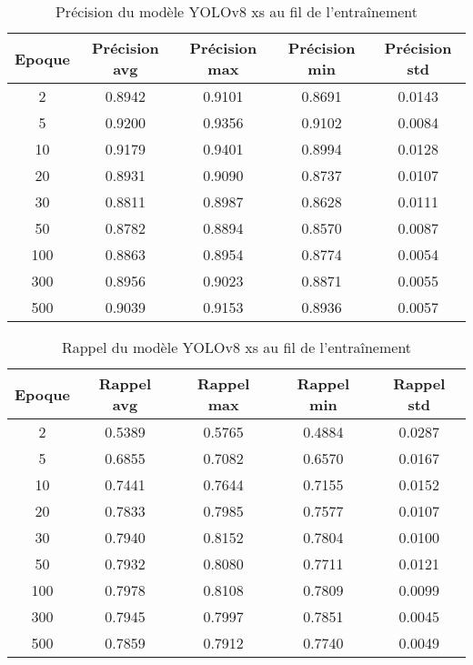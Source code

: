 \begin{table}[!ht]
    \caption{Précision du modèle YOLOv8 xs au fil de l'entraînement}
    \label{tab:yolov8xs_precision}
    \centering
    \begin{tabular}{ |c||c|c|c|c|  }
        \hline
        \rowcolor{gray!50}
        Epoque & Précision avg & Précision max & Précision min & Précision std\\
        \hline
        2 & 0.8942 & 0.9101 & 0.8691 & 0.0143\\
        5 & 0.9200 & 0.9356 & 0.9102 & 0.0084\\
        10 & 0.9179 & 0.9401 & 0.8994 & 0.0128\\
        20 & 0.8931 & 0.9090 & 0.8737 & 0.0107\\
        30 & 0.8811 & 0.8987 & 0.8628 & 0.0111\\
        50 & 0.8782 & 0.8894 & 0.8570 & 0.0087\\
        100 & 0.8863 & 0.8954 & 0.8774 & 0.0054\\
        300 & 0.8956 & 0.9023 & 0.8871 & 0.0055\\
        500 & 0.9039 & 0.9153 & 0.8936 & 0.0057\\
        \hline
    \end{tabular}
\end{table}

\begin{table}[!ht]
    \caption{Rappel du modèle YOLOv8 xs au fil de l'entraînement}
    \label{tab:yolov8xs_rappel}
    \centering
    \begin{tabular}{ |c||c|c|c|c|  }
        \hline
        \rowcolor{gray!50}
        Epoque & Rappel avg & Rappel max & Rappel min & Rappel std\\
        \hline
        2 & 0.5389 & 0.5765 & 0.4884 & 0.0287\\
        5 & 0.6855 & 0.7082 & 0.6570 & 0.0167\\
        10 & 0.7441 & 0.7644 & 0.7155 & 0.0152\\
        20 & 0.7833 & 0.7985 & 0.7577 & 0.0107\\
        30 & 0.7940 & 0.8152 & 0.7804 & 0.0100\\
        50 & 0.7932 & 0.8080 & 0.7711 & 0.0121\\
        100 & 0.7978 & 0.8108 & 0.7809 & 0.0099\\
        300 & 0.7945 & 0.7997 & 0.7851 & 0.0045\\
        500 & 0.7859 & 0.7912 & 0.7740 & 0.0049\\
        \hline
    \end{tabular}
\end{table}

